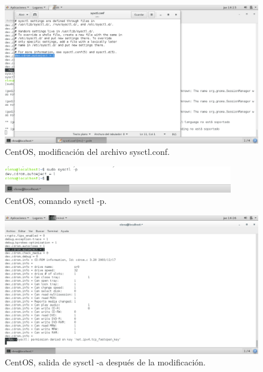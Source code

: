 \begin{figure}[H] 
	\centering
	\includegraphics[width=14.7cm]{./img/ejercicio1_3.png} 	
	\caption{CentOS, modificación del archivo sysctl.conf.} \label{fig:ejercicio1_3}
\end{figure}

\begin{figure}[H] 
	\centering
	\includegraphics[width=10cm]{./img/ejercicio1_4.png} 	
	\caption{CentOS, comando sysctl -p.} \label{fig:ejercicio1_4}
\end{figure}

\begin{figure}[H] 
	\centering
	\includegraphics[width=13cm]{./img/ejercicio1_5.png} 	
	\caption{CentOS,  salida de sysctl -a después de la modificación.} \label{fig:ejercicio1_5}
\end{figure}



